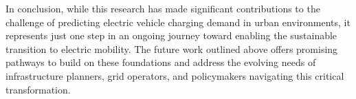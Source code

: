 In conclusion, while this research has made significant contributions to the challenge of predicting electric vehicle charging demand in urban environments, it represents just one step in an ongoing journey toward enabling the sustainable transition to electric mobility. The future work outlined above offers promising pathways to build on these foundations and address the evolving needs of infrastructure planners, grid operators, and policymakers navigating this critical transformation.
